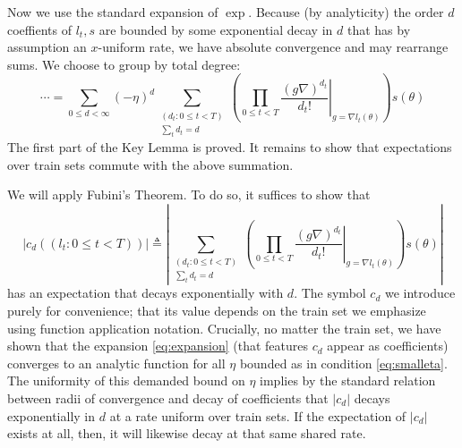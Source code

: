 \documentclass{article}
\theoremstyle{plain}
\theoremstyle{definition}
\newcommand{\wrap}[1]{\left(#1\right)}
\newcommand{\wabs}[1]{\left|#1\right|}
\begin{document}
            Now we use the standard expansion of $\exp$.  Because (by
            analyticity) the order $d$ coeffients of $l_t, s$ are bounded by
            some exponential decay in $d$ that has by assumption an $x$-uniform
            rate, we have absolute convergence and may rearrange sums.  We
            choose to group by total degree:
            \begin{equation} \label{eq:expansion}
                \cdots 
                =
                \sum_{0\leq d < \infty} (-\eta)^d
                \sum_{\substack{(d_t: 0\leq t<T) \\ \sum_t d_t = d}}
                \wrap{
                    \prod_{0 \leq t < T} \left.
                        \frac{(g \nabla)^{d_t}}{d_t!}
                    \right|_{g=\nabla l_t(\theta)}
                } s (\theta)
            \end{equation}
            The first part of the Key Lemma is proved.  It remains to show that
            expectations over train sets commute with the above summation.

            We will apply Fubini's Theorem.  To do so, it suffices to show that   
            $$
                \wabs{c_d((l_t: 0\leq t<T))} 
                \triangleq
                \wabs{
                    \sum_{\substack{(d_t: 0\leq t<T) \\ \sum_t d_t = d}}
                    \wrap{
                        \prod_{0 \leq t < T} \left.
                            \frac{(g \nabla)^{d_t}}{d_t!}
                        \right|_{g=\nabla l_t(\theta)}
                    } s (\theta)
                }
            $$
            has an expectation that decays exponentially with $d$.  The symbol
            $c_d$ we introduce purely for convenience; that its value depends
            on the train set we emphasize using function application
            notation.  Crucially, no matter the train set, we have shown
            that the expansion \ref{eq:expansion} (that features $c_d$ appear
            as coefficients) converges to an analytic function for all $\eta$
            bounded as in condition \ref{eq:smalleta}.  The uniformity of this
            demanded bound on $\eta$ implies by the standard relation between
            radii of convergence and decay of coefficients that $\wabs{c_d}$
            decays exponentially in $d$ at a rate uniform over train sets.
            If the expectation of $\wabs{c_d}$ exists at all, then, it will
            likewise decay at that same shared rate.
            
\end{document}

